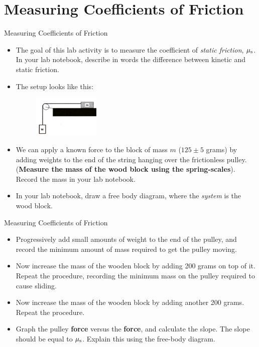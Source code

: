 \documentclass{beamer}
\begin{document}
\section{Measuring Coefficients of Friction}

\begin{frame}{Measuring Coefficients of Friction}
\begin{itemize}
\small
\item The goal of this lab activity is to measure the coefficient of \textit{static friction}, $\mu_{\rm s}$.  In your lab notebook, describe in words the difference between kinetic and static friction.
\item The setup looks like this:
\begin{figure}
\centering
\includegraphics[width=0.3\textwidth]{figures/slide.png}
\end{figure}
\item We can apply a known force to the block of mass $m$ ($125\pm5$ grams) by adding weights to the end of the string hanging over the frictionless pulley.  (\textbf{Measure the mass of the wood block using the spring-scales}).  Record the mass in your lab notebook.
\item In your lab notebook, draw a free body diagram, where the \textit{system} is the wood block.
\end{itemize}
\end{frame}

\begin{frame}{Measuring Coefficients of Friction}
\begin{itemize}
\small
\item Progressively add small amounts of weight to the end of the pulley, and record the minimum amount of mass required to get the pulley moving.
\item Now increase the mass of the wooden block by adding 200 grams on top of it.  Repeat the procedure, recording the minimum mass on the pulley required to cause sliding.
\item Now increase the mass of the wooden block by adding another 200 grams.  Repeat the procedure.
\item Graph the pulley \textbf{force} versus the \textbf{force}, and calculate the slope.  The slope should be equal to $\mu_{\rm s}$.  Explain this using the free-body diagram.
\end{itemize}
\end{frame}
\end{document}
